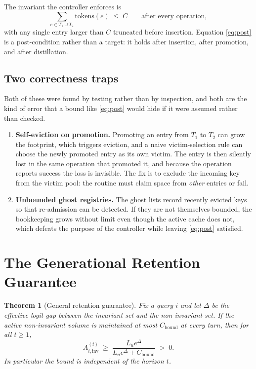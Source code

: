 \documentclass[11pt,a4paper]{article}
\theoremstyle{plain}
\newtheorem{theorem}{Theorem}
\theoremstyle{definition}
\theoremstyle{remark}
\newcommand{\Ainv}{A_{i,\mathrm{inv}}}
\begin{document}
The invariant the controller enforces is
\begin{equation}
  \sum_{e \in T_1 \cup T_2} \mathrm{tokens}(e) \;\le\; C
  \qquad \text{after every operation},
  \label{eq:post}
\end{equation}
with any single entry larger than $C$ truncated before insertion. Equation
\eqref{eq:post} is a post-condition rather than a target: it holds after
insertion, after promotion, and after distillation.

\subsection{Two correctness traps}

Both of these were found by testing rather than by inspection, and both are the
kind of error that a bound like \eqref{eq:post} would hide if it were assumed
rather than checked.

\begin{enumerate}[label=(\alph*), leftmargin=*]
  \item \textbf{Self-eviction on promotion.} Promoting an entry from $T_1$ to
        $T_2$ can grow the footprint, which triggers eviction, and a naive
        victim-selection rule can choose the newly promoted entry as its own
        victim. The entry is then silently lost in the same operation that
        promoted it, and because the operation reports success the loss is
        invisible. The fix is to exclude the incoming key from the victim pool:
        the routine must claim space from \emph{other} entries or fail.
  \item \textbf{Unbounded ghost registries.} The ghost lists record recently
        evicted keys so that re-admission can be detected. If they are not
        themselves bounded, the bookkeeping grows without limit even though the
        active cache does not, which defeats the purpose of the controller while
        leaving \eqref{eq:post} satisfied.
\end{enumerate}

\section{The Generational Retention Guarantee}
\label{sec:guarantee}

\begin{theorem}[General retention guarantee]
\label{thm:guarantee}
Fix a query $i$ and let $\Delta$ be the effective logit gap between the
invariant set and the non-invariant set. If the active non-invariant volume is
maintained at most $C_{\mathrm{bound}}$ at every turn, then for all $t \ge 1$,
\begin{equation}
  \Ainv^{(t)}
  \;\ge\;
  \frac{L_u e^{\Delta}}{L_u e^{\Delta} + C_{\mathrm{bound}}}
  \;>\; 0 .
  \label{eq:guarantee}
\end{equation}
In particular the bound is independent of the horizon $t$.
\end{theorem}
\end{document}
